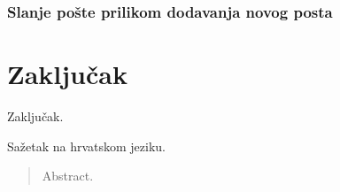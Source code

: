 \documentclass[times, utf8, zavrsni]{fer}
\begin{document}
\subsection{Slanje pošte prilikom dodavanja novog posta}


\chapter{Zaključak}
Zaključak.




\begin{sazetak}
	Sažetak na hrvatskom jeziku.
		
\end{sazetak}

\begin{abstract}
	Abstract.
		
\end{abstract}
\end{document}
